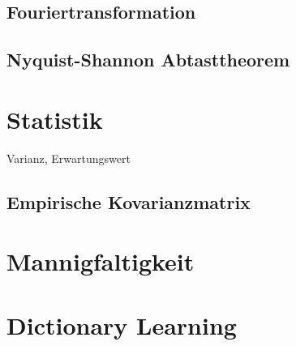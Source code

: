 \subsection{Fouriertransformation}
\subsection{Nyquist-Shannon Abtasttheorem}

\section{Statistik}
Varianz, Erwartungswert
\subsection{Empirische Kovarianzmatrix}

\section{Mannigfaltigkeit}

\section{Dictionary Learning}